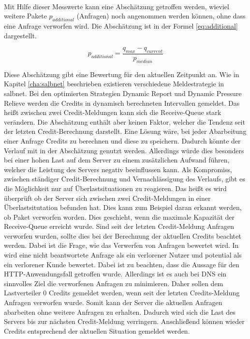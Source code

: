 \documentclass[a4paper, 12pt, BCOR10mm, DIV12, toc=bibliography, toc=listof, german]{scrbook}
\begin{document}
		$~$\\
		Mit Hilfe dieser Messwerte kann eine Abschätzung getroffen werden, wieviel weitere Pakete
		$p_{additional}$ (Anfragen) noch angenommen werden können, ohne dass eine Anfrage verworfen wird.
		Die Abschätzung ist in der Formel \ref{eq:additional} dargestellt. 

		\begin{equation}
			p_{additional} = \frac{q_{max} - q_{current}}{p_{median}}
			\label{eq:additional}
		\end{equation}

		Diese Abschätzung gibt eine Bewertung für den aktuellen Zeitpunkt an. Wie in Kapitel
		\ref{cha:salbnet} beschrieben existieren verschiedene Meldestrategie in salbnet. Bei den
		optimierten Strategien Dynamic Report und Dynamic Pressure Relieve werden die Credits in
		dynamisch berechneten Intervallen gemeldet. Das heißt zwischen zwei Credit-Meldungen kann sich
		die Receive-Queue stark verändern. Die Abschätzung enthält aber keinen Faktor, welcher die
		Tendenz seit der letzten Credit-Berechnung darstellt. Eine Lösung wäre, bei jeder Abarbeitung
		einer Anfrage Credits zu berechnen und diese zu speichern. Dadurch könnte der Verlauf mit in der
		Abschätzung genutzt werden. Allerdings würde dies besonders bei einer hohen Last auf dem Server
		zu einem zusätzlichen Aufwand führen, welcher die Leistung des Servers negativ beeinflussen
		kann. Als Kompromiss, zwischen ständiger Credit-Berechnung und Vernachlässigung des Verlaufs,
		gibt es die Möglichkeit nur auf Überlastsituationen zu reagieren. Das heißt es wird überprüft ob
		der Server sich zwischen zwei Credit-Meldungen in einer Überlastsitutation befunden hat. Dies
		kann zum Beispiel daran erkannt werden, ob Paket verworfen worden. Dies geschieht, wenn die
		maximale Kapazität der Receive-Queue erreicht wurde. Sind seit der letzten Credit-Meldung
		Anfragen verworfen wurden, sollte dies bei der Berechnung der aktuellen Credits beachtet werden.
		Dabei ist die Frage, wie das Verwerfen von Anfragen bewertet wird. In \cite{scsczile2008} wird
		eine nicht beantwortete Anfrage als ein verlorener Nutzer und potential als ein verlorener Kunde
		bewertet. Dabei ist zu beachten, dass die Aussage für den HTTP-Anwendungsfall getroffen wurde.
		Allerdings ist es auch bei DNS ein sinnvolles Ziel die verworfenen Anfragen zu minimieren. Daher
		sollen dem Lastverteiler 0 Credits gemeldet werden, wenn seit der letzten Credits-Meldung
		Anfragen verworfen wurde. Somit kann der Server die aktuellen Anfragen abarbeiten ohne weitere
		Anfragen zu erhalten. Dadurch wird sich die Last des Servers bis zur nächsten Credit-Meldung
		verringern. Anschließend können wieder Credits entsprechend der aktuellen Situation gemeldet
		werden.
		
\end{document}
